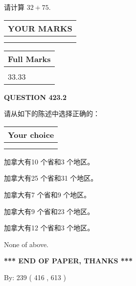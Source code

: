 \documentclass{ctexart}
\begin{document}
  
 
请计算 $ %
32 +  %
75 $.
 

 

 
  
\vspace{0.2in}
  
\noindent\begin{tabular}{|l|}
\hline
 YOUR MARKS  \\
\hline
 \\ 
 \\ 
\hline
\end{tabular}
\hspace{0.05in} \begin{tabular}{|l|}
\hline
 Full Marks  \\
\hline
 \\ 
33.33 \\
\hline
\end{tabular}
{\textbf{\Large{QUESTION
423.2 
}}}
  
  
请从如下的陈述中选择正确的：
  
  
\noindent\hspace{3.0in} \begin{tabular}{|l|}
\hline
Your choice \\
\hline
 \\ 
 \\ 
\hline
\end{tabular}
  
  
 
 
加拿大有10 个省和3 个地区。
 
 
加拿大有25 个省和31 个地区。
 
 
加拿大有7 个省和9 个地区。
 
 
加拿大有9 个省和23 个地区。
 
 
加拿大有12 个省和3 个地区。
 
 
 None of above.
 
 
   
   
 \vspace{0.2in}
 
   
   
   
   
\vspace{1.0in} 
{\textbf{\large{ *** END OF PAPER, THANKS *** }}} 
   
   
\hspace{1.0in} By: 
 239 ( 416 ,  613 )
   
\end{document}
